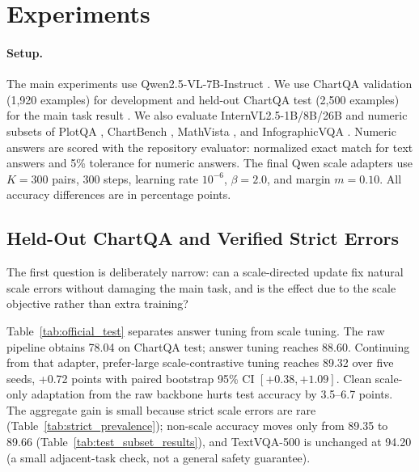 \section{Experiments}
\label{sec:experiments}

\paragraph{Setup.}
The main experiments use Qwen2.5-VL-7B-Instruct \citep{qwen25vl2025}. We use ChartQA validation (1{,}920 examples) for development and held-out ChartQA test (2{,}500 examples) for the main task result \citep{masry2022chartqa}. We also evaluate InternVL2.5-1B/8B/26B \citep{internvl25} and numeric subsets of PlotQA \citep{methani2020plotqa}, ChartBench \citep{chartbench2024}, MathVista \citep{lu2023mathvista}, and InfographicVQA \citep{mathew2022infographicvqa}. Numeric answers are scored with the repository evaluator: normalized exact match for text answers and 5\% tolerance for numeric answers. The final Qwen scale adapters use $K=300$ pairs, 300 steps, learning rate $10^{-6}$, $\beta=2.0$, and margin $m=0.10$. All accuracy differences are in percentage points.

\subsection{Held-Out ChartQA and Verified Strict Errors}

The first question is deliberately narrow: can a scale-directed update fix natural scale errors without damaging the main task, and is the effect due to the scale objective rather than extra training?

\begin{table}[t]
\centering
\small
\resizebox{\linewidth}{!}{}
\caption{Held-out ChartQA test attribution for Qwen2.5-VL-7B. The scale update is measured on top of the answer-tuned adapter; clean direct scale-only tuning is a safety control. ``Large-positive'' denotes the prefer-large adapter.}
\label{tab:official_test}
\end{table}

Table~\ref{tab:official_test} separates answer tuning from scale tuning. The raw pipeline obtains 78.04 on ChartQA test; answer tuning reaches 88.60. Continuing from that adapter, prefer-large scale-contrastive tuning reaches 89.32 over five seeds, +0.72 points with paired bootstrap 95\% CI $[+0.38,+1.09]$. Clean scale-only adaptation from the raw backbone hurts test accuracy by 3.5--6.7 points. The aggregate gain is small because strict scale errors are rare (Table~\ref{tab:strict_prevalence}); non-scale accuracy moves only from 89.35 to 89.66 (Table~\ref{tab:test_subset_results}), and TextVQA-500 is unchanged at 94.20 (a small adjacent-task check, not a general safety guarantee).

